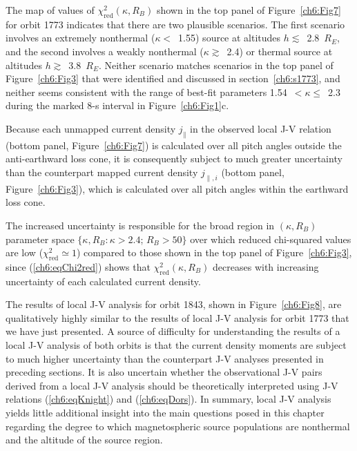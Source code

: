   The map of values of $\chi^2_{\mathrm{red}} (\kappa, R_B)$ shown in the top
  panel of Figure~\ref{ch6:Fig7} for orbit 1773 indicates that there are two
  plausible scenarios. The first scenario involves an extremely nonthermal
  ($\kappa <$~1.55) source at altitudes $h \lesssim$~2.8~$R_E$, and the second
  involves a weakly nonthermal ($\kappa \gtrsim$~2.4) or thermal source at
  altitudes $h \gtrsim$~3.8~$R_E$. Neither scenario matches \DIFdelbegin {}\DIFdelend \DIFaddbegin {}\DIFaddend scenarios in the
  top panel of Figure~\ref{ch6:Fig3} that were identified and discussed in
  section~\ref{ch6:s1773}, and neither seems consistent with the range of
  best-fit parameters 1.54~$< \kappa \leq$~2.3 during the marked 8-s interval in
  Figure~\ref{ch6:Fig1}c.

  Because each unmapped current density $j_\parallel$ in the observed local J-V
  relation (bottom panel, Figure~\ref{ch6:Fig7}) is calculated over all pitch
  angles outside the anti-earthward loss cone, it is consequently subject to
  much greater uncertainty than the counterpart mapped current density
  $j_{\parallel,i}$ (bottom panel, Figure~\ref{ch6:Fig3}), which is calculated
  over all pitch angles within the earthward loss cone.

  The increased uncertainty is responsible for the broad region in
  $(\kappa, R_B)$ parameter space $\{ \kappa, R_B : \kappa > 2.4$; $R_B > 50 \}$
  over which reduced chi-squared values are low
  ($\chi_{\mathrm{red}}^2 \simeq 1$) compared to those shown in the top panel of
  Figure~\ref{ch6:Fig3}, since (\ref{ch6:eqChi2red}) shows that
  $\chi^2_{\mathrm{red}} (\kappa, R_B)$ decreases with increasing uncertainty of
  each calculated current density.

  The results of local J-V analysis for orbit 1843, shown in
  Figure~\ref{ch6:Fig8}, are qualitatively highly similar to the results of
  local J-V analysis for orbit 1773 that we have just presented. A source of
  difficulty for understanding the results of a local J-V analysis of both
  orbits is that the current density moments are subject to much higher
  uncertainty than the counterpart J-V analyses presented in preceding
  sections. It is also uncertain whether the observational J-V pairs derived
  from a local J-V analysis should be theoretically interpreted using J-V
  relations (\ref{ch6:eqKnight}) and (\ref{ch6:eqDors}). In summary, local J-V
  analysis yields little additional insight into the main questions posed in
  this chapter regarding the degree to which magnetospheric source populations
  are nonthermal and the altitude of the source region.

